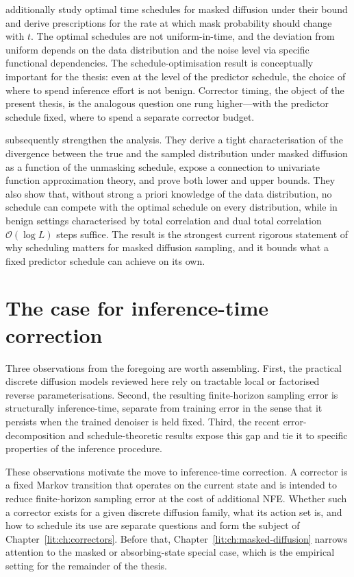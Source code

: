 \textcite{lavenant2025lz} additionally study optimal time schedules for
masked diffusion under their bound and derive prescriptions for the rate at
which mask probability should change with $t$. The optimal schedules are
not uniform-in-time, and the deviation from uniform depends on the data
distribution and the noise level via specific functional dependencies. The
schedule-optimisation result is conceptually important for the thesis:
even at the level of the predictor schedule, the choice of where to spend
inference effort is not benign. Corrector timing, the object of the present
thesis, is the analogous question one rung higher---with the predictor
schedule fixed, where to spend a separate corrector budget.

\textcite{chen2025optimalschedules} subsequently strengthen the analysis.
They derive a tight characterisation of the divergence between the true and
the sampled distribution under masked diffusion as a function of the
unmasking schedule, expose a connection to univariate function
approximation theory, and prove both lower and upper bounds. They also show
that, without strong a priori knowledge of the data distribution, no
schedule can compete with the optimal schedule on every distribution,
while in benign settings characterised by total correlation and dual total
correlation $\mathcal{O}(\log L)$ steps suffice. The result is the
strongest current rigorous statement of why scheduling matters for masked
diffusion sampling, and it bounds what a fixed predictor schedule can
achieve on its own.

\section{The case for inference-time correction}
\label{lit:sec:case-correction}

Three observations from the foregoing are worth assembling. First, the
practical discrete diffusion models reviewed here rely on tractable local
or factorised reverse parameterisations. Second, the resulting
finite-horizon sampling error is structurally inference-time, separate
from training error in the sense that it persists when the trained
denoiser is held fixed. Third, the recent error-decomposition and
schedule-theoretic results
\parencite{lavenant2025lz,chen2025optimalschedules} expose this gap and
tie it to specific properties of the inference procedure.

These observations motivate the move to inference-time correction. A
corrector is a fixed Markov transition that operates on the current state
and is intended to reduce finite-horizon sampling error at the cost of
additional NFE. Whether
such a corrector exists for a given discrete diffusion family, what its
action set is, and how to schedule its use are separate questions and form
the subject of Chapter~\ref{lit:ch:correctors}. Before that,
Chapter~\ref{lit:ch:masked-diffusion} narrows attention to the masked or
absorbing-state special case, which is the empirical setting for the
remainder of the thesis.


